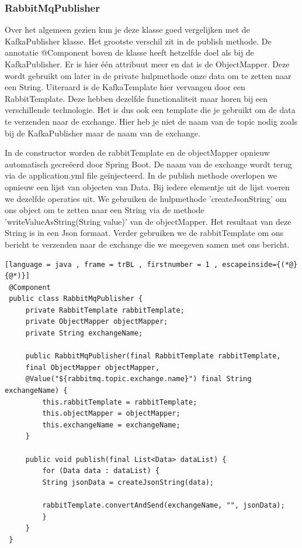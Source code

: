  \subsubsection{RabbitMqPublisher}
 Over het algemeen gezien kun je deze klasse goed vergelijken met de KafkaPublisher klasse. Het grootste verschil zit in de publish methode. De annotatie @Component boven de klasse heeft hetzelfde doel als bij de KafkaPublisher. Er is hier één attribuut meer en dat is de ObjectMapper. Deze wordt gebruikt om later in de private hulpmethode onze data om te zetten naar een String. Uiteraard is de KafkaTemplate hier vervangen door een RabbitTemplate. Deze hebben dezelfde functionaliteit maar horen bij een verschillende technologie. Het is dus ook een template die je gebruikt om de data te verzenden naar de exchange. Hier heb je niet de naam van de topic nodig zoals bij de KafkaPublisher maar de naam van de exchange.
 
 In de constructor worden de rabbitTemplate en de objectMapper opnieuw automatisch gecreëerd door Spring Boot. De naam van de exchange wordt terug via de application.yml file geïnjecteerd. In de publish methode overlopen we opnieuw een lijst van objecten van Data. Bij iedere elementje uit de lijst voeren we dezelfde operaties uit. We gebruiken de hulpmethode 'createJsonString' om ons object om te zetten naar een String via de methode 'writeValueAsString(String value)' van de objectMapper. Het resultaat van deze String is in een Json formaat. Verder gebruiken we de rabbitTemplate om ons bericht te verzenden naar de exchange die we meegeven samen met ons bericht.
   \begin{lstlisting}[language = java , frame = trBL , firstnumber = 1 , escapeinside={(*@}{@*)}]
 @Component
 public class RabbitMqPublisher {
     private RabbitTemplate rabbitTemplate;
     private ObjectMapper objectMapper;
     private String exchangeName;
     
     public RabbitMqPublisher(final RabbitTemplate rabbitTemplate,
     final ObjectMapper objectMapper,
     @Value("${rabbitmq.topic.exchange.name}") final String exchangeName) {
         this.rabbitTemplate = rabbitTemplate;
         this.objectMapper = objectMapper;
         this.exchangeName = exchangeName;
     }
     
     public void publish(final List<Data> dataList) {
         for (Data data : dataList) {
         String jsonData = createJsonString(data);
         
         rabbitTemplate.convertAndSend(exchangeName, "", jsonData);
         }
     }
 }
     \end{lstlisting}
